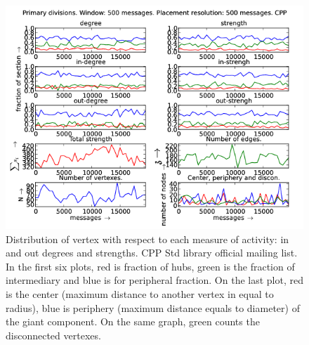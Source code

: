 \documentclass[%
 aip,
 jmp,%
 amsmath,amssymb,
 reprint,%
]{revtex4-1}
\begin{document}
\begin{figure}[hbtp] 
   \centering
        \includegraphics[width=\textwidth]{figs/CPP/500}
    \caption{Distribution of vertex with respect to each measure of activity: in and out degrees and strengths. CPP Std library official mailing list. In the first six plots, red is fraction of hubs, green is the fraction of intermediary and blue is for peripheral fraction. On the last plot, red is the center (maximum distance to another vertex in equal to radius), blue is periphery (maximum distance equals to diameter) of the giant component. On the same graph, green counts the disconnected vertexes.}
    \label{fig:cpp500}
\end{figure}
\end{document}
